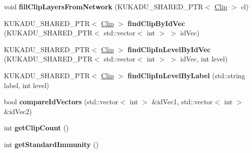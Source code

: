 \begin{DoxyCompactItemize}
\item 
void {\bfseries fill\+Clip\+Layers\+From\+Network} (K\+U\+K\+A\+D\+U\+\_\+\+S\+H\+A\+R\+E\+D\+\_\+\+P\+TR$<$ \hyperlink{classkukadu_1_1Clip}{Clip} $>$ cl)\hypertarget{classkukadu_1_1ProjectiveSimulator_ac828f78597b965f87e702dd0642fa08f}{}\label{classkukadu_1_1ProjectiveSimulator_ac828f78597b965f87e702dd0642fa08f}

\item 
K\+U\+K\+A\+D\+U\+\_\+\+S\+H\+A\+R\+E\+D\+\_\+\+P\+TR$<$ \hyperlink{classkukadu_1_1Clip}{Clip} $>$ {\bfseries find\+Clip\+By\+Id\+Vec} (K\+U\+K\+A\+D\+U\+\_\+\+S\+H\+A\+R\+E\+D\+\_\+\+P\+TR$<$ std\+::vector$<$ int $>$ $>$ id\+Vec)\hypertarget{classkukadu_1_1ProjectiveSimulator_a4ca0e0196f65af2b779b4c82dd17de8e}{}\label{classkukadu_1_1ProjectiveSimulator_a4ca0e0196f65af2b779b4c82dd17de8e}

\item 
K\+U\+K\+A\+D\+U\+\_\+\+S\+H\+A\+R\+E\+D\+\_\+\+P\+TR$<$ \hyperlink{classkukadu_1_1Clip}{Clip} $>$ {\bfseries find\+Clip\+In\+Level\+By\+Id\+Vec} (K\+U\+K\+A\+D\+U\+\_\+\+S\+H\+A\+R\+E\+D\+\_\+\+P\+TR$<$ std\+::vector$<$ int $>$ $>$ id\+Vec, int level)\hypertarget{classkukadu_1_1ProjectiveSimulator_ad1e515f6331ab4ad332b0b4baeaa7668}{}\label{classkukadu_1_1ProjectiveSimulator_ad1e515f6331ab4ad332b0b4baeaa7668}

\item 
K\+U\+K\+A\+D\+U\+\_\+\+S\+H\+A\+R\+E\+D\+\_\+\+P\+TR$<$ \hyperlink{classkukadu_1_1Clip}{Clip} $>$ {\bfseries find\+Clip\+In\+Level\+By\+Label} (std\+::string label, int level)\hypertarget{classkukadu_1_1ProjectiveSimulator_aceef6e9292f13d36a1c75fe2432b9d10}{}\label{classkukadu_1_1ProjectiveSimulator_aceef6e9292f13d36a1c75fe2432b9d10}

\item 
bool {\bfseries compare\+Id\+Vectors} (std\+::vector$<$ int $>$ \&id\+Vec1, std\+::vector$<$ int $>$ \&id\+Vec2)\hypertarget{classkukadu_1_1ProjectiveSimulator_aacb71a7ed83541dcfc383ee3e47c55d5}{}\label{classkukadu_1_1ProjectiveSimulator_aacb71a7ed83541dcfc383ee3e47c55d5}

\item 
int {\bfseries get\+Clip\+Count} ()\hypertarget{classkukadu_1_1ProjectiveSimulator_ab0de7a9e711ccdb9f162913a8aae532b}{}\label{classkukadu_1_1ProjectiveSimulator_ab0de7a9e711ccdb9f162913a8aae532b}

\item 
int {\bfseries get\+Standard\+Immunity} ()\hypertarget{classkukadu_1_1ProjectiveSimulator_a3b53862020f96d5d98d197b9c0c54327}{}\label{classkukadu_1_1ProjectiveSimulator_a3b53862020f96d5d98d197b9c0c54327}


\end{DoxyCompactItemize}
